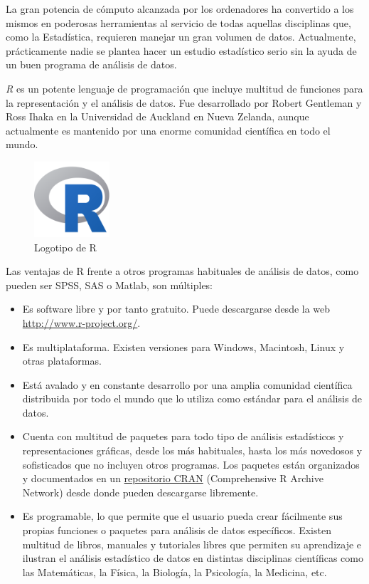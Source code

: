 \documentclass[
  a4paper,
]{scrreport}
\providecommand{\tightlist}{%
  \setlength{\itemsep}{0pt}\setlength{\parskip}{0pt}}\usepackage{longtable,booktabs,array}
\theoremstyle{definition}
\theoremstyle{remark}
\begin{document}
La gran potencia de cómputo alcanzada por los ordenadores ha convertido
a los mismos en poderosas herramientas al servicio de todas aquellas
disciplinas que, como la Estadística, requieren manejar un gran volumen
de datos. Actualmente, prácticamente nadie se plantea hacer un estudio
estadístico serio sin la ayuda de un buen programa de análisis de datos.

\emph{R} es un potente lenguaje de programación que incluye multitud de
funciones para la representación y el análisis de datos. Fue
desarrollado por Robert Gentleman y Ross Ihaka en la Universidad de
Auckland en Nueva Zelanda, aunque actualmente es mantenido por una
enorme comunidad científica en todo el mundo.

\begin{figure}

{\centering \includegraphics[width=0.25\textwidth,height=\textheight]{img/logos/Rlogo.png}

}

\caption{Logotipo de R}

\end{figure}

Las ventajas de R frente a otros programas habituales de análisis de
datos, como pueden ser SPSS, SAS o Matlab, son múltiples:

\begin{itemize}
\tightlist
\item
  Es software libre y por tanto gratuito. Puede descargarse desde la web
  \url{http://www.r-project.org/}.
\item
  Es multiplataforma. Existen versiones para Windows, Macintosh, Linux y
  otras plataformas.
\item
  Está avalado y en constante desarrollo por una amplia comunidad
  científica distribuida por todo el mundo que lo utiliza como estándar
  para el análisis de datos.
\item
  Cuenta con multitud de paquetes para todo tipo de análisis
  estadísticos y representaciones gráficas, desde los más habituales,
  hasta los más novedosos y sofisticados que no incluyen otros
  programas. Los paquetes están organizados y documentados en un
  \href{https://cran.r-project.org/}{repositorio CRAN} (Comprehensive R
  Archive Network) desde donde pueden descargarse libremente.
\item
  Es programable, lo que permite que el usuario pueda crear fácilmente
  sus propias funciones o paquetes para análisis de datos específicos.
  Existen multitud de libros, manuales y tutoriales libres que permiten
  su aprendizaje e ilustran el análisis estadístico de datos en
  distintas disciplinas científicas como las Matemáticas, la Física, la
  Biología, la Psicología, la Medicina, etc.
\end{itemize}
\end{document}
